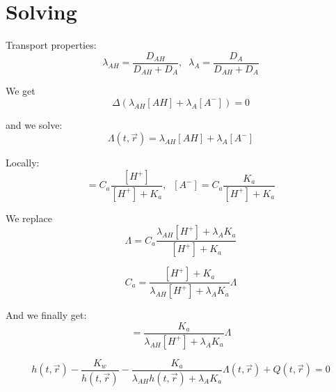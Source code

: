 \documentclass[aps,12pt]{revtex4}
\begin{document}
\section{Solving}

Transport properties:
\begin{equation}
	\lambda_{AH} = \dfrac{D_{AH}}{D_{AH}+D_A}, \;\; \lambda_{A} = \dfrac{D_{A}}{D_{AH}+D_A}
\end{equation}

We get
\begin{equation}
	\Delta\left( \lambda_{AH} [AH] + \lambda_{A} [A^-] \right) = 0
\end{equation}

and we solve:
\begin{equation}
	\Lambda(t,\vec r) = \lambda_{AH} [AH] + \lambda_{A} [A^-]
\end{equation}	
	
Locally:
\begin{equation}
	[AH] = C_a \dfrac{ [H^+] }{ [H^+] + K_a }, \;\; [A^-] = C_a \dfrac{ K_a }{ [H^+] + K_a }
\end{equation}	

We replace
\begin{equation}
	\Lambda = C_a \dfrac{\lambda_{AH} [H^+] + \lambda_{A} K_a}{[H^+]+K_a}
\end{equation}

\begin{equation}
	C_a = \dfrac{[H^+]+K_a}{\lambda_{AH} [H^+] + \lambda_{A} K_a} \Lambda
\end{equation}

And we finally get:
\begin{equation}
	[A^-] = \dfrac{K_a}{\lambda_{AH} [H^+] + \lambda_{A} K_a} \Lambda
\end{equation}

\begin{equation}
	h(t,\vec r) - \dfrac{K_w}{h(t, \vec r)} - \dfrac{K_a}{\lambda_{AH} h(t,\vec r) + \lambda_{A} K_a} \Lambda(t,\vec r) + Q(t,\vec r) = 0
\end{equation}
\end{document}
